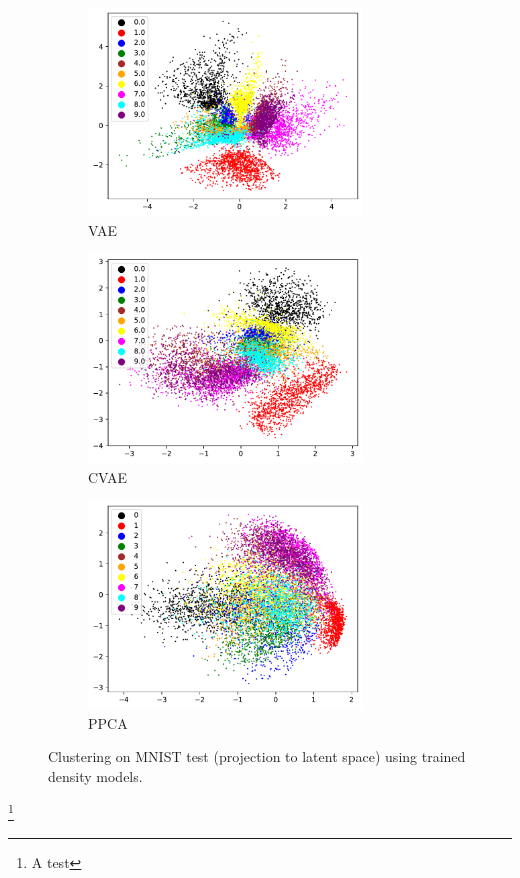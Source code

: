 \begin{figure}[H]
	\begin{subfigure}[t]{0.49\textwidth}
		\centering
		\includegraphics[width = 0.8\textwidth]{figures/VAE/clustering}
		\caption{VAE}
		\label{fig:vae:clustering}
	\end{subfigure}
	\begin{subfigure}[t]{0.49\textwidth}
		\centering
		\includegraphics[width = 0.8\textwidth]{figures/CVAE/clustering}
		\caption{CVAE}
		\label{fig:cvae:clustering}
	\end{subfigure}
	\begin{subfigure}[t]{0.49\textwidth}
		\centering
		\includegraphics[width = 0.8\textwidth]{figures/ppca/clustering}
		\caption{PPCA}
		\label{fig:ppca:clustering}
	\end{subfigure}
	\caption{Clustering on MNIST test (projection to latent space) using trained density models.}	
\end{figure}



\footnote{A test}
\citep{bishop2006pattern}



